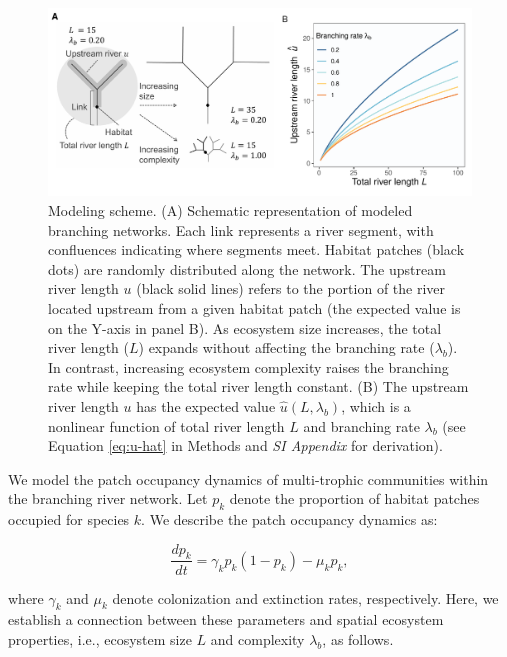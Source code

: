 \documentclass[11pt, class=article, crop=false]{standalone}
\begin{document}
\noindent\makebox[\linewidth]{\rule{\textwidth}{0.4pt}}

\begin{figure}
    \centering
    \includegraphics[width=\textwidth]{output/fig_theo_scheme.pdf}
    \caption{Modeling scheme. (A) Schematic representation of modeled branching networks. Each link represents a river segment, with confluences indicating where segments meet. Habitat patches (black dots) are randomly distributed along the network. The upstream river length $u$ (black solid lines) refers to the portion of the river located upstream from a given habitat patch (the expected value is on the Y-axis in panel B). As ecosystem size increases, the total river length ($L$) expands without affecting the branching rate ($\lambda_b$). In contrast, increasing ecosystem complexity raises the branching rate while keeping the total river length constant. (B) The upstream river length $u$ has the expected value $\hat{u}(L, \lambda_b)$, which is a nonlinear function of total river length $L$ and branching rate $\lambda_b$ (see Equation \ref{eq:u-hat} in Methods and \textit{SI Appendix} for derivation).}
    \label{fig:scheme}
\end{figure}

\noindent\makebox[\linewidth]{\rule{\textwidth}{0.4pt}}

We model the patch occupancy dynamics of multi-trophic communities within the branching river network.
Let $p_k$ denote the proportion of habitat patches occupied for species $k$.
We describe the patch occupancy dynamics as:

\begin{equation}
    \frac{dp_k}{dt} = \gamma_{k} p_k (1 - p_k) - \mu_k p_k,
    \label{eq:model0}
\end{equation}

where $\gamma_k$ and $\mu_k$ denote colonization and extinction rates, respectively.
Here, we establish a connection between these parameters and spatial ecosystem properties, i.e., ecosystem size $L$ and complexity $\lambda_b$, as follows.
\end{document}

